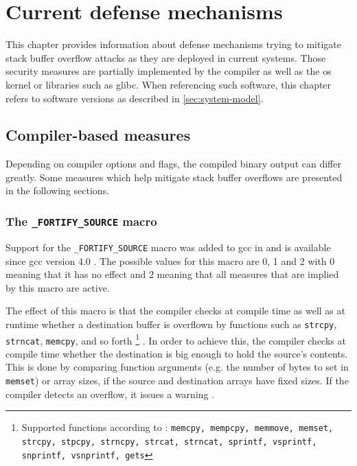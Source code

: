 \chapter{Current defense mechanisms}
\label{chp:current-defense-mechanisms}

This chapter provides information about defense mechanisms trying to mitigate stack buffer overflow attacks as they are deployed in current systems.
Those security measures are partially implemented by the compiler as well as the \gls{os} kernel or libraries such as \gls{glibc}.
When referencing such software, this chapter refers to software versions as described in \cref{sec:system-model}.

\section{Compiler-based measures}
\label{sec:compiler-based-measures}

Depending on compiler options and flags, the compiled binary output can differ greatly.
Some measures which help mitigate stack buffer overflows are presented in the following sections.

\subsection{The \texttt{\_FORTIFY\_SOURCE} macro}
\label{subsec:fortify-source}

Support for the \texttt{\_FORTIFY\_SOURCE} macro was added to \gls{gcc} in  and is available since \gls{gcc} version 4.0 \cite{Sharma2014}.
The possible values for this macro are 0, 1 and 2 with 0 meaning that it has no effect and 2 meaning that all measures that are implied by this macro are active.

The effect of this macro is that the compiler checks at compile time as well as at runtime whether a destination buffer is overflown by functions such as \texttt{strcpy}, \texttt{strncat}, \texttt{memcpy}, and so forth%
	\footnote{Supported functions according to \cite{Kerrisk2020,Sharma2014}: \texttt{memcpy, mempcpy, memmove, memset, strcpy, stpcpy, strncpy, strcat, strncat, sprintf, vsprintf, snprintf, vsnprintf, gets}}%
.
In order to achieve this, the compiler checks at compile time whether the destination is big enough to hold the source's contents.
This is done by comparing function arguments (e.g. the number of bytes to set in \texttt{memset}) or array sizes, if the source and destination arrays have fixed sizes.
If the compiler detects an overflow, it issues a warning \cite{Jelinek2004,Kerrisk2020,Sharma2014,Sidhpurwala2018}.

